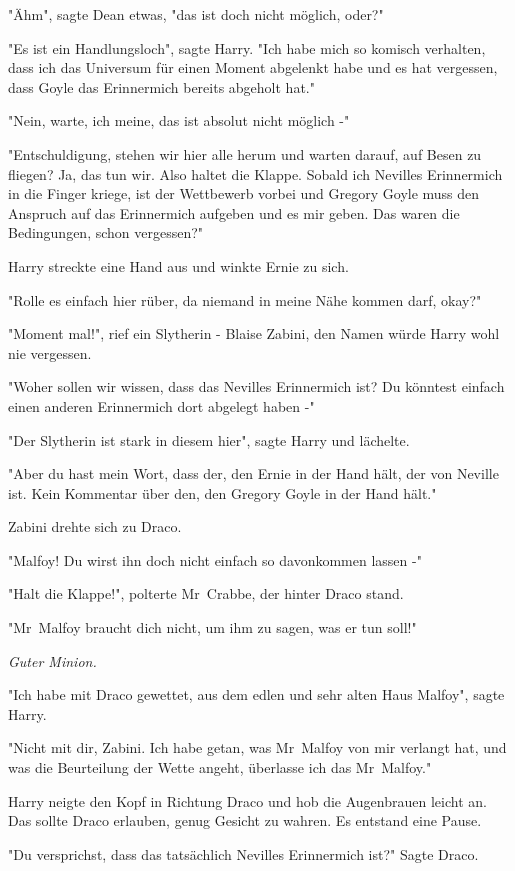 {"Ähm", sagte Dean etwas, "das ist doch nicht möglich, oder?"

"Es ist ein Handlungsloch", sagte Harry. "Ich habe mich so komisch verhalten, dass ich das Universum für einen Moment abgelenkt habe und es hat vergessen, dass Goyle das Erinnermich bereits abgeholt hat."

"Nein, warte, ich meine, das ist absolut nicht möglich -"

"Entschuldigung, stehen wir hier alle herum und warten darauf, auf Besen zu fliegen? Ja, das tun wir. Also haltet die Klappe. Sobald ich Nevilles Erinnermich in die Finger kriege, ist der Wettbewerb vorbei und Gregory Goyle muss den Anspruch auf das Erinnermich aufgeben und es mir geben. Das waren die Bedingungen, schon vergessen?"

Harry streckte eine Hand aus und winkte Ernie zu sich.

"Rolle es einfach hier rüber, da niemand in meine Nähe kommen darf, okay?"

"Moment mal!", rief ein Slytherin - Blaise Zabini, den Namen würde Harry wohl nie vergessen.

"Woher sollen wir wissen, dass das Nevilles Erinnermich ist? Du könntest einfach einen anderen Erinnermich dort abgelegt haben -"

"Der Slytherin ist stark in diesem hier", sagte Harry und lächelte.

"Aber du hast mein Wort, dass der, den Ernie in der Hand hält, der von Neville ist. Kein Kommentar über den, den Gregory Goyle in der Hand hält."

Zabini drehte sich zu Draco.

"Malfoy! Du wirst ihn doch nicht einfach so davonkommen lassen -"

"Halt die Klappe!", polterte Mr~Crabbe, der hinter Draco stand.

"Mr~Malfoy braucht dich nicht, um ihm zu sagen, was er tun soll!"

\emph{Guter Minion.}

"Ich habe mit Draco gewettet, aus dem edlen und sehr alten Haus Malfoy", sagte Harry.

"Nicht mit dir, Zabini. Ich habe getan, was Mr~Malfoy von mir verlangt hat, und was die Beurteilung der Wette angeht, überlasse ich das Mr~Malfoy."

Harry neigte den Kopf in Richtung Draco und hob die Augenbrauen leicht an. Das sollte Draco erlauben, genug Gesicht zu wahren. Es entstand eine Pause.

"Du versprichst, dass das tatsächlich Nevilles Erinnermich ist?" Sagte Draco.

}
